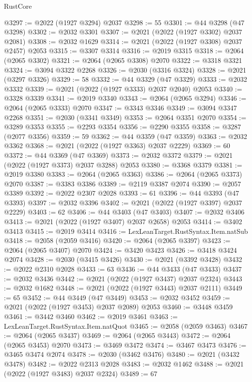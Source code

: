\begin{lexlean}{RustCore}
\begin{coremodule}
@3297 := @2022 (@1927 @3294) @2037
@3298 := 55
@3301 := @44 @3298 (@47 @3298)
@3302 := @2032 @3301
@3307 := @2021 (@2022 (@1927 @3302) @2037 @2081)
@3308 := @2032 @1629
@3314 := @2021 (@2022 (@1927 @3308) @2037 @2457) @2053
@3315 := @3307 @3314
@3316 := @2019 @3315
@3318 := @2064 (@2065 @3302)
@3321 := @2064 (@2065 @3308) @2070
@3322 := @3318 @3321
@3324 := @3094 @3322 @2268
@3326 := @2030 (@3316 @3324)
@3328 := @2021 (@3297 @3326)
@3329 := 58
@3332 := @44 @3329 (@47 @3329)
@3333 := @2032 @3332
@3339 := @2021 (@2022 (@1927 @3333) @2037 @2040) @2053
@3340 := @3328 @3339
@3341 := @2019 @3340
@3343 := @2064 (@2065 @3294)
@3346 := @2064 (@2065 @3333) @2070
@3347 := @3343 @3346
@3349 := @3094 @3347 @2268
@3351 := @2030 (@3341 @3349)
@3353 := @2064 @3351 @2070
@3354 := @3289 @3353
@3355 := @2293 @3354
@3356 := @2290 @3355
@3358 := @3287 (@2077 @3356)
@3359 := 59
@3362 := @44 @3359 (@47 @3359)
@3363 := @2032 @3362
@3368 := @2021 (@2022 (@1927 @3363) @2037 @2229)
@3369 := 60
@3372 := @44 @3369 (@47 @3369)
@3373 := @2032 @3372
@3379 := @2021 (@2022 (@1927 @3373) @2037 @3288) @2053
@3380 := @3368 @3379
@3381 := @2019 @3380
@3383 := @2064 (@2065 @3363)
@3386 := @2064 (@2065 @3373) @2070
@3387 := @3383 @3386
@3389 := @2119 @3387 @2074
@3390 := @2057 @3389
@3392 := @2022 @2307 @2028
@3393 := 61
@3396 := @44 @3393 (@47 @3393)
@3397 := @2032 @3396
@3402 := @2021 (@2022 (@1927 @3397) @2037 @2229)
@3403 := 62
@3406 := @44 @3403 (@47 @3403)
@3407 := @2032 @3406
@3413 := @2021 (@2022 (@1927 @3407) @2037 @2658) @2053
@3414 := @3402 @3413
@3415 := @2019 @3414
@3416 := LexLeanTarget.RustSyntax.Item.natSub
@3418 := @2058 (@2059 @3416)
@3420 := @2064 (@2065 @3397)
@3423 := @2064 (@2065 @3407) @2070
@3424 := @3420 @3423
@3426 := @3418 @3424 @2074
@3428 := @2030 (@3415 @3426)
@3430 := @2021 (@3392 @3428)
@3432 := @2022 @2310 @2028
@3433 := 63
@3436 := @44 @3433 (@47 @3433)
@3437 := @2032 @3436
@3442 := @2021 (@2022 (@1927 @3437) @2037 @2324)
@3443 := @2032 @1682
@3448 := @2021 (@2022 (@1927 @3443) @2037 @2111)
@3449 := 65
@3452 := @44 @3449 (@47 @3449)
@3453 := @2032 @3452
@3459 := @2021 (@2022 (@1927 @3453) @2037 @2089) @2053
@3460 := @3448 @3459
@3461 := @3442 @3460
@3462 := @2019 @3461
@3463 := LexLeanTarget.RustSyntax.Item.natQuot
@3465 := @2058 (@2059 @3463)
@3467 := @2064 (@2065 @3437)
@3469 := @2064 (@2065 @3443)
@3472 := @2064 (@2065 @3453) @2070
@3473 := @3469 @3472
@3474 := @3467 @3473
@3476 := @3465 @3474 @2074
@3478 := @2030 (@3462 @3476)
@3480 := @2021 (@3432 @3478)
@3482 := @2022 @2313 @2028
@3483 := @2032 @1462
@3488 := @2021 (@2022 (@1927 @3483) @2037 @2324)
@3489 := 67

\end{coremodule}
\end{lexlean}
